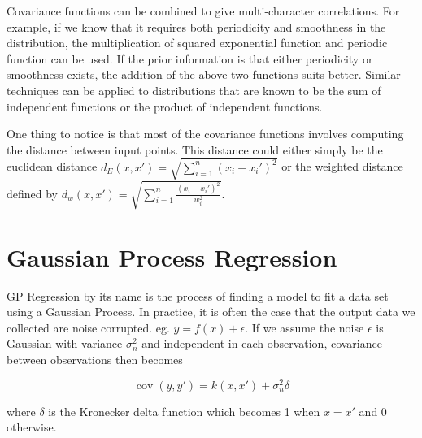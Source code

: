 \documentclass[11pt]{report}
\numberwithin{equation}{chapter}
\begin{document}
\begin{spacing}{2}
Covariance functions can be combined to give multi-character correlations. For example, if we know that it requires both periodicity and smoothness in the distribution, the multiplication of squared exponential function and periodic function can be used. If the prior information is that either periodicity or smoothness exists, the addition of the above two functions suits better. Similar techniques can be applied to distributions that are known to be the sum of independent functions or the product of independent functions.

One thing to notice is that most of the covariance functions involves computing the distance between input points. This distance could either simply be the euclidean distance $d_E(x,x\prime) = \sqrt{\sum\limits_{i=1}^n(x_i - x_i\prime)^2}$ or the weighted distance defined by $d_w(x,x\prime) = \sqrt{\sum\limits_{i=1}^n\frac{(x_i - x_i\prime)^2}{w_i^2}}$.


\section{Gaussian Process Regression}

GP Regression by its name is the process of finding a model to fit a data set using a Gaussian Process. In practice, it is often the case that the output data we collected are noise corrupted. eg. $y = f(x)+ \epsilon$. If we assume the noise $\epsilon$ is Gaussian with variance $\sigma_n^2$ and independent in each observation, covariance between observations then becomes

\begin{equation}
\label{cov_y}
\operatorname{cov}(y,y\prime) = k(x,x\prime) + \sigma_n^2\delta
\end{equation}

where $\delta$ is the Kronecker delta function which becomes 1 when $x = x\prime$ and 0 otherwise.


\end{spacing}
\end{document}
